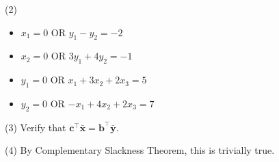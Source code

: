 (2)
\begin{itemize}
    \item $ x_1=0 $ OR $ \boxed{y_1-y_2=-2} $
    \item $ \boxed{x_2=0} $ OR $ 3y_1+4y_2=-1 $
    \item $ y_1=0 $ OR $ \boxed{x_1+3x_2+2x_3=5} $
    \item $ y_2=0 $ OR $ \boxed{-x_1+4x_2+2x_3=7} $
\end{itemize}

(3) Verify that $ \bm{c}^\top \bm{\bar{x}}=\bm{b}^\top \bm{\bar{y}} $.

(4) By Complementary Slackness Theorem, this is trivially true.
